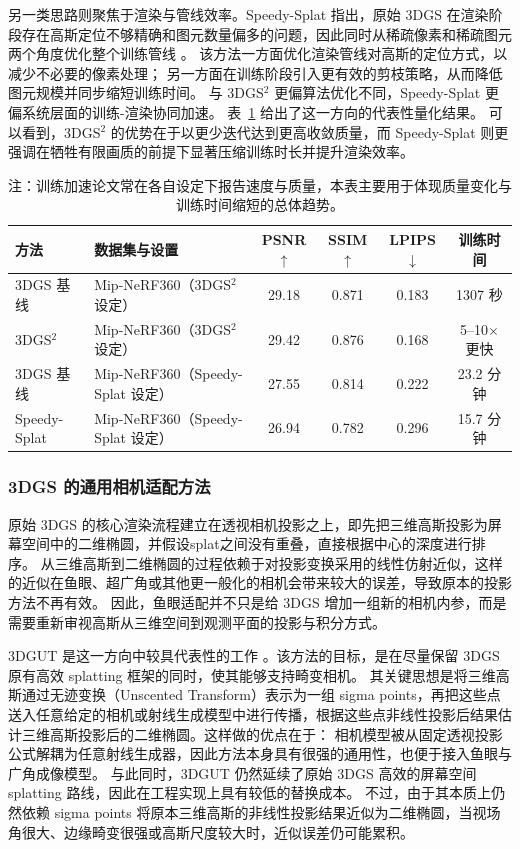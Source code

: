 另一类思路则聚焦于渲染与管线效率。Speedy-Splat 指出，原始 3DGS 在渲染阶段存在高斯定位不够精确和图元数量偏多的问题，因此同时从稀疏像素和稀疏图元两个角度优化整个训练管线 \cite{hanson2025speedy}。
该方法一方面优化渲染管线对高斯的定位方式，以减少不必要的像素处理；
另一方面在训练阶段引入更有效的剪枝策略，从而降低图元规模并同步缩短训练时间。
与 3DGS$^2$ 更偏算法优化不同，Speedy-Splat 更偏系统层面的训练-渲染协同加速。
表~\ref{tab:gs-train} 给出了这一方向的代表性量化结果。
可以看到，3DGS$^2$ 的优势在于以更少迭代达到更高收敛质量，而 Speedy-Splat 则更强调在牺牲有限画质的前提下显著压缩训练时长并提升渲染效率。

\begin{table}[htbp]
    \centering
    \caption{3DGS 训练加速方向的代表性结果}
    \label{tab:gs-train}
    \small
    \begin{tabular}{llcccc}
        \toprule
        方法 & 数据集与设置 & PSNR$\uparrow$ & SSIM$\uparrow$ & LPIPS$\downarrow$ & 训练时间 \\
        \midrule
        3DGS 基线 & Mip-NeRF360（3DGS$^2$ 设定） & 29.18 & 0.871 & 0.183 & 1307 秒 \\
        3DGS$^2$ & Mip-NeRF360（3DGS$^2$ 设定） & 29.42 & 0.876 & 0.168 & 5--10$\times$ 更快 \\
        3DGS 基线 & Mip-NeRF360（Speedy-Splat 设定） & 27.55 & 0.814 & 0.222 & 23.2 分钟 \\
        Speedy-Splat & Mip-NeRF360（Speedy-Splat 设定） & 26.94 & 0.782 & 0.296 & 15.7 分钟 \\
        \bottomrule
    \end{tabular}
    \caption*{\footnotesize 注：训练加速论文常在各自设定下报告速度与质量，本表主要用于体现质量变化与训练时间缩短的总体趋势。}
\end{table}

\subsubsection{3DGS 的通用相机适配方法}

原始 3DGS 的核心渲染流程建立在透视相机投影之上，即先把三维高斯投影为屏幕空间中的二维椭圆，并假设splat之间没有重叠，直接根据中心的深度进行排序。
从三维高斯到二维椭圆的过程依赖于对投影变换采用的线性仿射近似，这样的近似在鱼眼、超广角或其他更一般化的相机会带来较大的误差，导致原本的投影方法不再有效。
因此，鱼眼适配并不只是给 3DGS 增加一组新的相机内参，而是需要重新审视高斯从三维空间到观测平面的投影与积分方式。

3DGUT 是这一方向中较具代表性的工作 \cite{wu20253dgut}。该方法的目标，是在尽量保留 3DGS 原有高效 splatting 框架的同时，使其能够支持畸变相机。
其关键思想是将三维高斯通过无迹变换（Unscented Transform）表示为一组 sigma points，再把这些点送入任意给定的相机或射线生成模型中进行传播，根据这些点非线性投影后结果估计三维高斯投影后的二维椭圆。这样做的优点在于：
相机模型被从固定透视投影公式解耦为任意射线生成器，因此方法本身具有很强的通用性，也便于接入鱼眼与广角成像模型。
与此同时，3DGUT 仍然延续了原始 3DGS 高效的屏幕空间 splatting 路线，因此在工程实现上具有较低的替换成本。
不过，由于其本质上仍然依赖 sigma points 将原本三维高斯的非线性投影结果近似为二维椭圆，当视场角很大、边缘畸变很强或高斯尺度较大时，近似误差仍可能累积。

